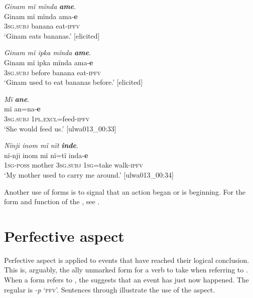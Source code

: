 \ea%
    \label{ex:verbs:26}
          \textit{Ginam mï mïnda} \textbf{\textit{ame}}.\\
\gll Ginam  mï      mïnda    ama-\textbf{e}\\
    [name]  3\textsc{sg.subj}  banana    eat-\textsc{ipfv}\\
\glt `Ginam eats bananas.’ [elicited]
\z

\ea%
    \label{ex:verbs:27}
          \textit{Ginam mï ipka mïnda} \textbf{\textit{ame}}.\\
\gll Ginam  mï      ipka  mïnda  ama-\textbf{e}\\
    [name]  3\textsc{sg.subj}  before  banana  eat-\textsc{ipfv}\\
\glt `Ginam used to eat bananas before.’ [elicited]
\z

\ea%
    \label{ex:verbs:28}
         \textit{Mï} \textbf{\textit{ane}}.\\
\gll mï      an=na-\textbf{e}\\
    3\textsc{sg.subj}  1\textsc{pl.excl}=feed-\textsc{ipfv}\\
\glt `She would feed us.’ [ulwa013\_00:33]
\z

\ea%
    \label{ex:verbs:29}
          \textit{Nïnji inom mï nït} \textbf{\textit{inde}}.\\
\gll nï-nji    inom  mï       nï=tï    inda-\textbf{e}\\
    1\textsc{sg-poss}  mother  3\textsc{sg.subj}  1\textsc{sg}=take  walk-\textsc{ipfv}\\
\glt `My mother used to carry me around.’ [ulwa013\_00:34]
\z

Another use of  forms is to signal that an action began or is beginning. For the form and function of the  , see .


\section{Perfective aspect}\label{sec:4.5}


Perfective aspect is applied to events that have reached their logical conclusion. This is, arguably, the ally unmarked form for a verb to take when referring to  . When a  form refers to  , the  suggests that an event has just now happened. The regular   is \textit{{}-p} ‘\textsc{pfv}’. Sentences  through  illustrate the use of the  aspect.

